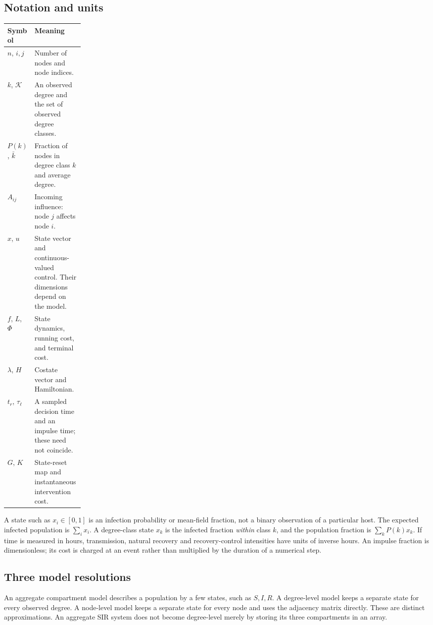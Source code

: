 \documentclass[11pt,a4paper]{article}
\theoremstyle{definition}
\theoremstyle{remark}
\begin{document}
\subsection{Notation and units}
\par\noindent\begin{tabularx}{\linewidth}{@{}p{0.18\linewidth}Y@{}}
\toprule
Symbol & Meaning \\
\midrule
$n$, $i,j$ & Number of nodes and node indices. \\
$k$, $\mathcal K$ & An observed degree and the set of observed degree classes. \\
$P(k)$, $\bar k$ & Fraction of nodes in degree class $k$ and average degree. \\
$A_{ij}$ & Incoming influence: node $j$ affects node $i$. \\
$x$, $u$ & State vector and continuous-valued control. Their dimensions depend on the model. \\
$f$, $L$, $\Phi$ & State dynamics, running cost, and terminal cost. \\
$\lambda$, $H$ & Costate vector and Hamiltonian. \\
$t_r$, $\tau_\ell$ & A sampled decision time and an impulse time; these need not coincide. \\
$G$, $K$ & State-reset map and instantaneous intervention cost. \\
\bottomrule
\end{tabularx}\par

A state such as $x_i\in[0,1]$ is an infection probability or mean-field fraction, not a binary observation of a particular host. The expected infected population is $\sum_i x_i$. A degree-class state $x_k$ is the infected fraction \emph{within} class $k$, and the population fraction is $\sum_k P(k)x_k$. If time is measured in hours, transmission, natural recovery and recovery-control intensities have units of inverse hours. An impulse fraction is dimensionless; its cost is charged at an event rather than multiplied by the duration of a numerical step.

\subsection{Three model resolutions}
An aggregate compartment model describes a population by a few states, such as $S,I,R$. A degree-level model keeps a separate state for every observed degree. A node-level model keeps a separate state for every node and uses the adjacency matrix directly. These are distinct approximations. An aggregate SIR system does not become degree-level merely by storing its three compartments in an array.
\end{document}
